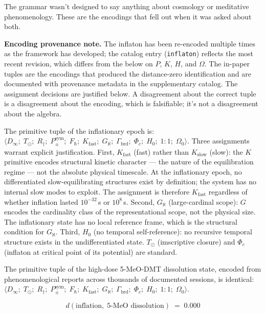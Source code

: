 \documentclass[12pt,a4paper]{article}
\newcommand{\Phic}{\Phi_c}
\newcommand{\Ppms}{P_{\pm}^{\text{sym}}}
\begin{document}
The grammar wasn't designed to say anything about cosmology or
meditative phenomenology. These are the encodings that fell out when
it was asked about both.

\textbf{Encoding provenance note.} The inflaton has been re-encoded
multiple times as the framework has developed; the catalog entry
(\texttt{inflaton}) reflects the most recent revision, which differs
from the below on $P$, $K$, $H$, and $\Omega$. The in-paper tuples
are the encodings that produced the distance-zero identification and
are documented with provenance metadata in the supplementary catalog.
The assignment decisions are justified below. A disagreement about
the correct tuple is a disagreement about the encoding, which is
falsifiable; it's not a disagreement about the algebra.

The primitive tuple of the inflationary epoch is:
$\langle D_\infty;\; T_\odot;\; R_\dagger;\; \Ppms;\; F_\hbar;\;
K_\text{fast};\; G_\aleph;\; \Gamma_\text{brd};\; \Phic;\; H_0;\; 1{:}1;\;
\Omega_0 \rangle$.
Three assignments warrant explicit justification. First, $K_\text{fast}$
(fast) rather than $K_\text{slow}$ (slow): the $K$ primitive
encodes structural kinetic character --- the nature of the
equilibration regime --- not the absolute physical timescale. At the
inflationary epoch, no differentiated slow-equilibrating structures
exist by definition; the system has no internal slow modes to exploit.
The assignment is therefore $K_\text{fast}$ regardless of whether
inflation lasted $10^{-32}$\,s or $10^8$\,s. Second, $G_\aleph$ (large-cardinal
scope): $G$ encodes the cardinality class of the representational
scope, not the physical size. The inflationary state has no local
reference frame, which is the structural condition for $G_\aleph$. Third,
$H_0$ (no temporal self-reference): no recursive temporal structure
exists in the undifferentiated state. $T_\odot$ (imscriptive closure)
and $\Phic$ (inflaton at critical point of its potential) are standard.

The primitive tuple of the high-dose 5-MeO-DMT dissolution state,
encoded from phenomenological reports across thousands of documented
sessions, is identical:
$\langle D_\infty;\; T_\odot;\; R_\dagger;\; \Ppms;\; F_\hbar;\;
K_\text{fast};\; G_\aleph;\; \Gamma_\text{brd};\; \Phic;\; H_0;\; 1{:}1;\;
\Omega_0 \rangle$.

\begin{equation}
  d(\text{inflation},\; \text{5-MeO dissolution}) \;=\; 0.000
  \label{eq:dissolution}
\end{equation}
\end{document}
